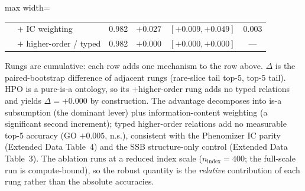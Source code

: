 \documentclass[pdflatex,sn-nature]{sn-jnl}
\begin{document}
\begin{appendices}
\begin{table}[htbp]
\begin{adjustbox}{max width=\textwidth}
\begin{tabular}{llcccc}
  & $+$ IC weighting                & 0.982 & $+0.027$   & $[+0.009,+0.049]$    & 0.003   \\
  & $+$ higher-order / typed        & 0.982 & $+0.000$   & $[+0.000,+0.000]$    & ---     \\
\bottomrule
\end{tabular}\end{adjustbox}
\begin{flushleft}
{\footnotesize
Rungs are cumulative: each row adds one mechanism to the row above. $\Delta$ is
the paired-bootstrap difference of adjacent rungs (rare-slice tail top-5, top-5
tail). HPO is a pure-is-a ontology, so its $+$higher-order rung adds no typed
relations and yields $\Delta{=}{+}0.000$ by construction. The advantage
decomposes into is-a subsumption (the dominant lever) plus information-content
weighting (a significant second increment); typed higher-order relations add no
measurable top-5 accuracy (GO $+0.005$, n.s.), consistent with the Phenomizer IC
parity (Extended Data Table~4) and the SSB structure-only control (Extended Data
Table~3). The ablation runs at a reduced index scale ($n_\text{index}{=}400$; the
full-scale run is compute-bound), so the robust quantity is the \emph{relative}
contribution of each rung rather than the absolute accuracies.}
\end{flushleft}
\label{tab:ed9_mechanism_ablation}
\end{table}




\end{appendices}
\end{document}
